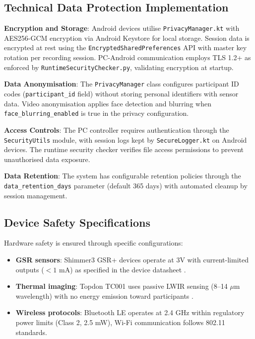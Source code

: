 \subsection{Technical Data Protection Implementation}

\textbf{Encryption and Storage}: Android devices utilise \texttt{PrivacyManager.kt} with AES256-GCM encryption via Android Keystore for local storage. Session data is encrypted at rest using the \texttt{EncryptedSharedPreferences} API with master key rotation per recording session. PC-Android communication employs TLS 1.2+ as enforced by \texttt{RuntimeSecurityChecker.py}, validating encryption at startup.

\textbf{Data Anonymisation}: The \texttt{PrivacyManager} class configures participant ID codes (\texttt{participant\_id} field) without storing personal identifiers with sensor data. Video anonymisation applies face detection and blurring when \texttt{face\_blurring\_enabled} is true in the privacy configuration.

\textbf{Access Controls}: The PC controller requires authentication through the \texttt{SecurityUtils} module, with session logs kept by \texttt{SecureLogger.kt} on Android devices. The runtime security checker verifies file access permissions to prevent unauthorised data exposure.

\textbf{Data Retention}: The system has configurable retention policies through the \texttt{data\_retention\_days} parameter (default 365 days) with automated cleanup by session management.

\subsection{Device Safety Specifications}
Hardware safety is ensured through specific configurations:
\begin{itemize}
	\item \textbf{GSR sensors}: Shimmer3 GSR+ devices operate at 3V with current-limited outputs ($<1$ mA) as specified in the device datasheet \cite{ref8}.
	\item \textbf{Thermal imaging}: Topdon TC001 uses passive LWIR sensing (8--14 $\mu$m wavelength) with no energy emission toward participants \cite{ref16}.
	\item \textbf{Wireless protocols}: Bluetooth LE operates at 2.4 GHz within regulatory power limits (Class 2, 2.5 mW), Wi-Fi communication follows 802.11 standards.
\end{itemize}
